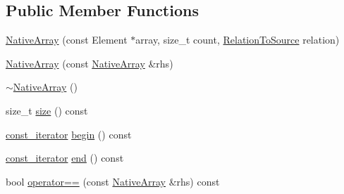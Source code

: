\subsection*{Public Member Functions}
\begin{DoxyCompactItemize}
\item 
\hyperlink{classtesting_1_1internal_1_1_native_array_a568de999aca0fc0c2cc574fac2405872}{Native\+Array} (const Element $\ast$array, size\+\_\+t count, \hyperlink{namespacetesting_1_1internal_aec4f0eeb60b6b8af8dcf979578bbf3bb}{Relation\+To\+Source} relation)
\item 
\hyperlink{classtesting_1_1internal_1_1_native_array_abb346ac3040f5da733f594cc2d5958bc}{Native\+Array} (const \hyperlink{classtesting_1_1internal_1_1_native_array}{Native\+Array} \&rhs)
\item 
\hyperlink{classtesting_1_1internal_1_1_native_array_a55ab5948d473a487303dcf6e02ad1f60}{$\sim$\+Native\+Array} ()
\item 
size\+\_\+t \hyperlink{classtesting_1_1internal_1_1_native_array_a45de2485baac8bf148e2943828094a40}{size} () const 
\item 
\hyperlink{classtesting_1_1internal_1_1_native_array_a9ce7c8408460d7158a2870456d134557}{const\+\_\+iterator} \hyperlink{classtesting_1_1internal_1_1_native_array_a49c534d29034d9230372ada54ef961bb}{begin} () const 
\item 
\hyperlink{classtesting_1_1internal_1_1_native_array_a9ce7c8408460d7158a2870456d134557}{const\+\_\+iterator} \hyperlink{classtesting_1_1internal_1_1_native_array_a4957ad1ebf7c21eab07d5e0ae2bb17aa}{end} () const 
\item 
bool \hyperlink{classtesting_1_1internal_1_1_native_array_a60af8d9c429771ee131b5ddf7e06e3c9}{operator==} (const \hyperlink{classtesting_1_1internal_1_1_native_array}{Native\+Array} \&rhs) const 
\end{DoxyCompactItemize}


